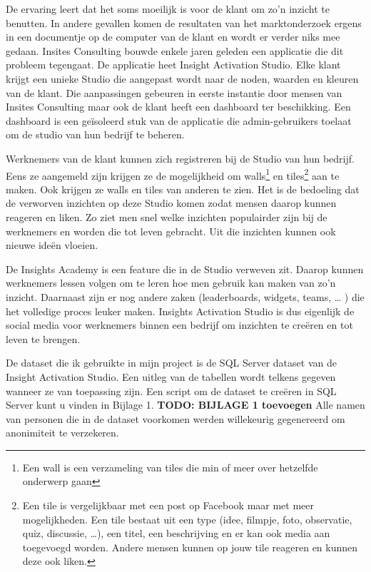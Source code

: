 De ervaring leert dat het soms moeilijk is voor de klant om zo'n inzicht te benutten. In andere gevallen komen de resultaten van het marktonderzoek ergens in een documentje op de computer van de klant en wordt er verder niks mee gedaan. Insites Consulting bouwde enkele jaren geleden een applicatie die dit probleem tegengaat. De applicatie heet Insight Activation Studio. Elke klant krijgt een unieke Studio die aangepast wordt naar de noden, waarden en kleuren van de klant. Die aanpassingen gebeuren in eerste instantie door mensen van Insites Consulting maar ook de klant heeft een dashboard ter beschikking. Een dashboard is een geïsoleerd stuk van de applicatie die admin-gebruikers toelaat om de studio van hun bedrijf te beheren.  

Werknemers van de klant kunnen zich registreren bij de Studio van hun bedrijf. Eens ze aangemeld zijn krijgen ze de mogelijkheid om walls\footnote{Een wall is een verzameling van tiles die min of meer over hetzelfde onderwerp gaan} en tiles\footnote{Een tile is vergelijkbaar met een post op Facebook maar met meer mogelijkheden. Een tile bestaat uit een type (idee, filmpje, foto, observatie, quiz, discussie, …), een titel, een beschrijving en er kan ook media aan toegevoegd worden. Andere mensen kunnen op jouw tile reageren en kunnen deze ook liken.} aan te maken. Ook krijgen ze walls en tiles van anderen te zien. Het is de bedoeling dat de verworven inzichten op deze Studio komen zodat mensen daarop kunnen reageren en liken. Zo ziet men snel welke inzichten populairder zijn bij de werknemers en worden die tot leven gebracht. Uit die inzichten kunnen ook nieuwe ideën vloeien.

De Insights Academy is een feature die in de Studio verweven zit. Daarop kunnen werknemers lessen volgen om te leren hoe men gebruik kan maken van zo’n inzicht. Daarnaast zijn er nog andere zaken (leaderboards, widgets, teams, … ) die het volledige proces leuker maken. Insights Activation Studio is dus eigenlijk de social media voor werknemers binnen een bedrijf om inzichten te creëren en tot leven te brengen.

De dataset die ik gebruikte in mijn project is de SQL Server dataset van de Insight Activation Studio. Een uitleg van de tabellen wordt telkens gegeven wanneer ze van toepassing zijn. Een script om de dataset te creëren in SQL Server kunt u vinden in Bijlage 1. \textbf{TODO: BIJLAGE 1 toevoegen} Alle namen van personen die in de dataset voorkomen werden willekeurig gegenereerd om anonimiteit te verzekeren.

